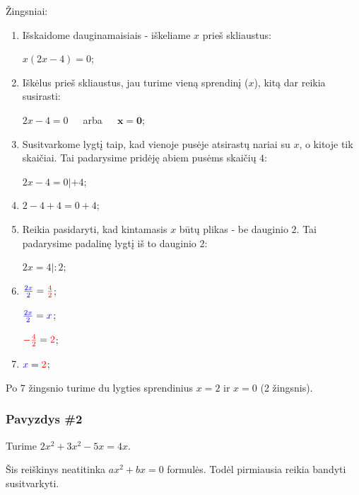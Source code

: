 \documentclass[a4paper]{article}
\begin{document}
Žingsniai:
\begin{enumerate}

      \item  Išskaidome dauginamaisiais - iškeliame $ x $ prieš skliaustus:

            $ x(2x - 4) = 0 $;
      \item  Iškėlus prieš skliaustus, jau turime vieną sprendinį ($ x $), kitą
            dar reikia susirasti:

            $ 2x-4 = 0 $ $\;\;\;$ arba $\;\;\;$ $ \boldsymbol{x=0} $;
      \item  Susitvarkome lygtį taip, kad vienoje pusėje atsirastų nariai su $
                  x
            $, o kitoje tik skaičiai. Tai padarysime pridėję abiem pusėms
            skaičių
            $ 4 $:

            $ 2x-4 = 0 | + 4 $;
      \item  $ 2-4+4 = 0+4 $;
      \item Reikia pasidaryti, kad kintamasis $ x $ būtų plikas - be dauginio $
                  2
            $. Tai padarysime padalinę lygtį iš to dauginio $ 2 $:

            $ 2x = 4 | : 2 $;
      \item $ \textcolor{blue}{\frac{2x}{2}} = \textcolor{red}{\frac{4}{2}} $;

            $ \textcolor{blue}{\frac{2x}{2}}=\textcolor{blue}{x} $;

            $ \textcolor{red}{-\frac{4}{2}}=\textcolor{red}{2} $;

      \item $ \textcolor{blue}{x} = \textcolor{red}{2} $;
\end{enumerate}

Po 7 žingsnio turime du lygties sprendinius $ x = 2 $ ir $ x=0 $ (2 žingsnis).

\subsubsection{Pavyzdys \#2}

Turime $ 2x^2 + 3x^2 - 5x = 4x $.

Šis reiškinys neatitinka $ ax^{2}+ bx = 0 $ formulės. Todėl pirmiausia reikia
bandyti susitvarkyti.
\end{document}
